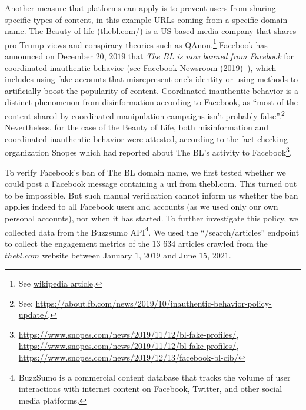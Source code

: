 \documentclass{article}
\begin{document}
Another measure that platforms can apply is to prevent users from sharing specific types of content, in this example URLs coming from a specific domain name. The Beauty of life (\href{https://thebl.com/}{thebl.com/}) is a US-based media company that shares pro-Trump views and conspiracy theories such as QAnon.\footnote{ See \href{https://en.wikipedia.org/wiki/The\_Epoch\_Times\#Removal\_of\_The\_BL\_(The\_Beauty\_of\_Life)\_from\_Facebook}{wikipedia article}.} Facebook has announced on December $20$, $2019$ that {\it The BL is now banned from Facebook} for coordinated inauthentic behavior (see Facebook Newsroom (2019)~\cite{newsroom1}), which includes using fake accounts that misrepresent one's identity or using methods to artificially boost the popularity of content. Coordinated inauthentic behavior is a distinct phenomenon from disinformation according to Facebook, as ``most of the content shared by coordinated manipulation campaigns isn’t probably false”.\footnote{See: \href{https://about.fb.com/news/2019/10/inauthentic-behavior-policy-update/}{https://about.fb.com/news/2019/10/inauthentic-behavior-policy-update/}.} Nevertheless, for the case of the Beauty of Life, both misinformation and coordinated inauthentic behavior were attested, according to the fact-checking organization Snopes which had reported about The BL’s activity to Facebook\footnote{\href{ https://www.snopes.com/news/2019/11/12/bl-fake-profiles/}{https://www.snopes.com/news/2019/11/12/bl-fake-profiles/}, \href{https://www.snopes.com/news/2019/11/12/bl-fake-profiles/}{https://www.snopes.com/news/2019/11/12/bl-fake-profiles/}, \href{https://www.snopes.com/news/2019/12/13/facebook-bl-cib/}{https://www.snopes.com/news/2019/12/13/facebook-bl-cib/}}.

To verify Facebook’s ban of The BL domain name, we first tested whether we could post a Facebook message containing a url from thebl.com. This turned out to be impossible. But such manual verification cannot inform us whether the ban applies indeed to all Facebook users and accounts (as we used only our own personal accounts), nor when it has started. To further investigate this policy, we collected data from the Buzzsumo API\footnote{BuzzSumo is a commercial content database that tracks the volume of user interactions with internet content on Facebook, Twitter, and other social media platforms.}. We used the ``/search/articles'' endpoint to collect the engagement metrics of the $13$ $634$ articles crawled from the $thebl.com$ website between January $1$, $2019$ and June $15$, $2021$.
\end{document}
